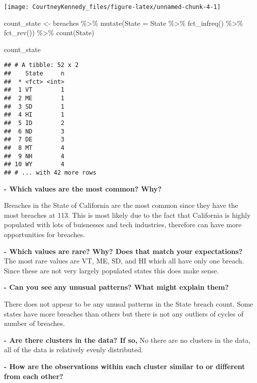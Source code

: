 \documentclass[
]{article}
\newenvironment{Shaded}{\begin{snugshade}}{\end{snugshade}}
\newcommand{\AttributeTok}[1]{\textcolor[rgb]{0.77,0.63,0.00}{#1}}
\newcommand{\FunctionTok}[1]{\textcolor[rgb]{0.00,0.00,0.00}{#1}}
\newcommand{\NormalTok}[1]{#1}
\newcommand{\OtherTok}[1]{\textcolor[rgb]{0.56,0.35,0.01}{#1}}
\newcommand{\SpecialCharTok}[1]{\textcolor[rgb]{0.00,0.00,0.00}{#1}}
\begin{document}
\begin{center}\texttt{[image: CourtneyKennedy\_files/figure-latex/unnamed-chunk-4-1]} \end{center}

\begin{Shaded}
\begin{Highlighting}[]
\NormalTok{count\_state }\OtherTok{\textless{}{-}}\NormalTok{ breaches }\SpecialCharTok{\%\textgreater{}\%}
  \FunctionTok{mutate}\NormalTok{(}\AttributeTok{State =}\NormalTok{ State }\SpecialCharTok{\%\textgreater{}\%} \FunctionTok{fct\_infreq}\NormalTok{() }\SpecialCharTok{\%\textgreater{}\%} \FunctionTok{fct\_rev}\NormalTok{()) }\SpecialCharTok{\%\textgreater{}\%}
  \FunctionTok{count}\NormalTok{(State)}

\NormalTok{count\_state}
\end{Highlighting}
\end{Shaded}

\begin{verbatim}
## # A tibble: 52 x 2
##    State     n
##  * <fct> <int>
##  1 VT        1
##  2 ME        1
##  3 SD        1
##  4 HI        1
##  5 ID        2
##  6 ND        3
##  7 DE        3
##  8 MT        4
##  9 NH        4
## 10 WY        4
## # ... with 42 more rows
\end{verbatim}

\textbf{- Which values are the most common? Why?}

Breaches in the State of California are the most common since they have
the most breaches at 113. This is most likely due to the fact that
California is highly populated with lots of buisnesses and tech
industries, therefore can have more opportunities for breaches.

\textbf{- Which values are rare? Why? Does that match your
expectations?} The most rare values are VT, ME, SD, and HI which all
have only one breach. Since these are not very largely populated states
this does make sense.

\textbf{- Can you see any unusual patterns? What might explain them?}

There does not appear to be any unusal patterns in the State breach
count. Some states have more breaches than others but there is not any
outliers of cycles of number of breaches.

\textbf{- Are there clusters in the data? If so,} No there are no
clusters in the data, all of the data is relatively evenly distributed.

\textbf{- How are the observations within each cluster similar to or
different from each other?}
\end{document}
